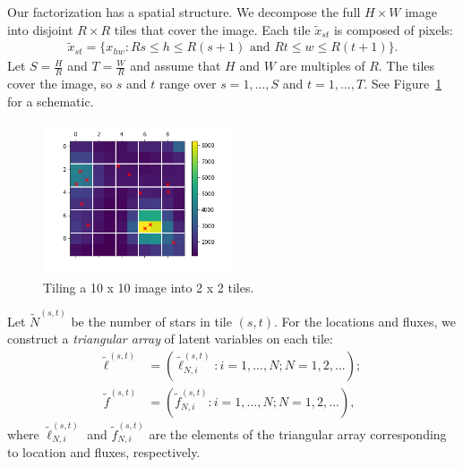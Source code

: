 Our factorization has a spatial structure. We decompose the full $H \times W$ image into disjoint $R \times R$ tiles that cover the image. Each tile $\tilde x_{st}$ is composed of pixels:
\begin{align}
    \tilde x_{st} = \{x_{hw} : Rs \leq h \leq R(s+1) \text{ and } Rt \leq w \leq R(t+1)\}.
    \label{eq:tiles}
\end{align}
Let $S = \frac{H}{R}$ and $T = \frac{W}{R}$ and assume that $H$ and $W$ are multiples of $R$. The tiles cover the image, so $s$ and $t$ range over $s = 1, ..., S$ and $t = 1, ..., T$. See Figure~\ref{fig:ex_tiles} for a schematic.
\begin{figure}[!ht]
    \centering
    \includegraphics[width = 0.5\textwidth]{figures/example_tiled.png}
    \vspace{-1cm}
    \caption{Tiling a 10 x 10 image into 2 x 2 tiles.}
    \label{fig:ex_tiles}
\end{figure}

Let $\tilde N^{(s, t)}$ be the number of stars in tile 
$(s,t)$. 
For the locations and fluxes, we construct a {\itshape triangular array}  of latent variables on each tile:
\begin{align}
    \tilde\ell^{(s, t)} &= (\tilde\ell_{N, i}^{(s, t)} : i = 1, ..., N; N = 1, 2, ...); \\
    \tilde f^{(s, t)} &= (\tilde f_{N, i}^{(s, t)} : i = 1, ..., N; N = 1, 2, ...),
\end{align}
where $\tilde\ell_{N, i}^{(s, t)}$ and $\tilde f_{N, i}^{(s, t)}$ are the elements of the triangular array corresponding to location and fluxes, respectively. 

